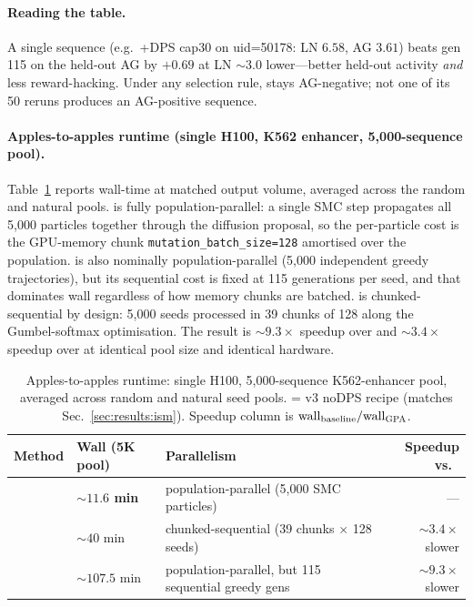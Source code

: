 \paragraph{Reading the table.}
A single \gpa{} sequence (e.g.\ +DPS cap30 on uid=50178: LN $6.58$, AG $3.61$) beats \ism{} gen 115 on the held-out AG by $+0.69$ at LN $\sim\!3.0$ lower—better held-out activity \emph{and} less reward-hacking. Under any selection rule, \ledidi{} stays AG-negative; not one of its 50 reruns produces an AG-positive sequence.

\paragraph{Apples-to-apples runtime (single H100, K562 enhancer, 5{,}000-sequence pool).}
Table~\ref{tab:ism_runtime} reports wall-time at matched output volume, averaged across the random and natural pools. \gpa{} is fully population-parallel: a single SMC step propagates all 5{,}000 particles together through the diffusion proposal, so the per-particle cost is the GPU-memory chunk \texttt{mutation\_batch\_size=128} amortised over the population. \ism{} is also nominally population-parallel (5{,}000 independent greedy trajectories), but its sequential cost is fixed at 115 generations per seed, and that dominates wall regardless of how memory chunks are batched. \ledidi{} is chunked-sequential by design: 5{,}000 seeds processed in 39 chunks of 128 along the Gumbel-softmax optimisation. The result is $\sim\!9.3\times$ speedup over \ism{} and $\sim\!3.4\times$ speedup over \ledidi{} at identical pool size and identical hardware.

\begin{table}[h]
\caption{Apples-to-apples runtime: single H100, 5{,}000-sequence K562-enhancer pool, averaged across random and natural seed pools. \gpa{} = v3 noDPS recipe (matches Sec.~\ref{sec:results:ism}). Speedup column is $\mathrm{wall}_{\text{baseline}}/\mathrm{wall}_{\textsc{GPA}{}}$.}
\label{tab:ism_runtime}
\centering
\small
\begin{tabular}{lllr}
\toprule
Method & Wall (5K pool) & Parallelism & Speedup vs.\ \gpa{} \\
\midrule
\textbf{\gpa{}} & \textbf{$\sim\!11.6$ min} & population-parallel (5{,}000 SMC particles) & --- \\
\ledidi{}       & $\sim\!40$ min     & chunked-sequential (39 chunks $\times$ 128 seeds) & $\sim\!3.4\times$ slower \\
\ism{}          & $\sim\!107.5$ min  & population-parallel, but 115 sequential greedy gens & $\sim\!9.3\times$ slower \\
\bottomrule
\end{tabular}
\end{table}

